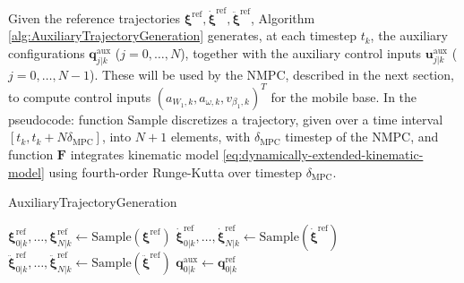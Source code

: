 Given the reference trajectories
$\bm{\xi}^{\mathrm{ref}}, \dot{\bm{\xi}}^{\mathrm{ref}}, \ddot{\bm{\xi}}^{\mathrm{ref}}$,
Algorithm \ref{alg:AuxiliaryTrajectoryGeneration} generates, at each timestep
$t_k$, the auxiliary configurations $\bm{q}_{j|k}^{\mathrm{aux}}$ ($j = 0, \dots, N$),
together with the auxiliary control inputs
$\bm{u}_{j|k}^{\mathrm{aux}}$ ($j = 0, \dots, N-1$). These will be used by the
NMPC, described in the next section, to compute control inputs
$(a_{W_1, k}, a_{\omega, k}, v_{\beta_1, k})^T$ for the mobile base.
In the pseudocode: function $\mathrm{Sample}$ discretizes a trajectory,
given over a time interval $[t_k, t_{k} + N \delta_{\mathrm{MPC}}]$, into
$N + 1$ elements, with $\delta_{\mathrm{MPC}}$ timestep of the NMPC, and
function $\bm{F}$ integrates kinematic model
\eqref{eq:dynamically-extended-kinematic-model} using fourth-order Runge-Kutta
over timestep $\delta_{\mathrm{MPC}}$.%

\begin{algorithm}
\small
\caption{AuxiliaryTrajectoryGeneration}
\label{alg:AuxiliaryTrajectoryGeneration}
\BlankLine
$\bm{\xi}_{0|k}^{\mathrm{ref}}, \dots, \bm{\xi}_{N|k}^{\mathrm{ref}} \gets \mathrm{Sample}(\bm{\xi}^{\mathrm{ref}})$\;
$\dot{\bm{\xi}}_{0|k}^{\mathrm{ref}}, \dots, \dot{\bm{\xi}}_{N|k}^{\mathrm{ref}} \gets \mathrm{Sample}(\dot{\bm{\xi}}^{\mathrm{ref}})$\;
$\ddot{\bm{\xi}}_{0|k}^{\mathrm{ref}}, \dots, \ddot{\bm{\xi}}_{N|k}^{\mathrm{ref}} \gets \mathrm{Sample}(\ddot{\bm{\xi}}^{\mathrm{ref}})$\;
$\bm{q}_{0|k}^{\mathrm{aux}} \gets \bm{q}_{0|k}^{\mathrm{ref}}$\;
\;
\end{algorithm}

